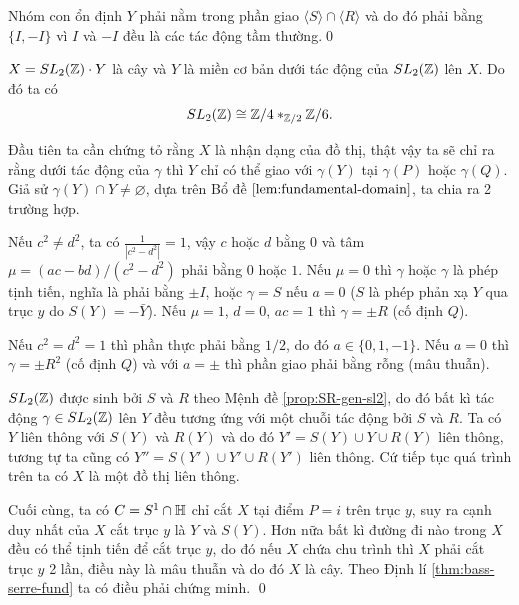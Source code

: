Nhóm con ổn định $Y$ phải nằm trong phần giao $\langle S \rangle \cap \langle R \rangle$ và do đó phải bằng $\{I,-I\}$ vì $I$ và $-I$ đều là các tác động tầm thường.\qed

\begin{theorem}
    $X = SL_2(\mathbb Z) \cdot Y$ là cây và $Y$ là miền cơ bản dưới tác động của $SL_2(\mathbb Z)$ lên $X$. Do đó ta có
    $$
        SL_2(\mathbb Z) \cong \mathbb Z/4 *_{\mathbb Z/2} \mathbb Z/6.
    $$
\end{theorem}

\startproof Đầu tiên ta cần chứng tỏ rằng $X$ là nhận dạng của đồ thị, thật vậy ta sẽ chỉ ra rằng dưới tác động của $\gamma$ thì $Y$ chỉ có thể giao với $\gamma (Y)$ tại $\gamma(P)$ hoặc $\gamma(Q)$. Giả sử $\gamma(Y) \cap Y \neq \varnothing$, dựa trên Bổ đề $\ref{lem:fundamental-domain}$, ta chia ra 2 trường hợp.

Nếu $c^2 \neq d^2$, ta có $\frac{1}{|c^2-d^2|} = 1$, vậy $c$ hoặc $d$ bằng $0$ và tâm $\mu = (ac-bd)/(c^2-d^2)$ phải bằng $0$ hoặc $1$. Nếu $\mu = 0$ thì $\gamma$ hoặc $\gamma$ là phép tịnh tiến, nghĩa là phải bằng $\pm I$, hoặc $\gamma = S$ nếu $a = 0$ ($S$ là phép phản xạ $Y$ qua trục $y$  do $S(Y) = -\bar{Y}$). Nếu $\mu = 1$, $d = 0$, $ac = 1$ thì $\gamma = \pm R$ (cố định $Q$).

Nếu $c^2 = d^2 = 1$ thì phần thực phải bằng $1/2$, do đó $a \in \{0,1,-1\}$. Nếu $a = 0$ thì $\gamma = \pm R^2$ (cố định $Q$) và với $a = \pm$ thì phần giao phải bằng rỗng (mâu thuẫn).

$SL_2(\mathbb Z)$ được sinh bởi $S$ và $R$ theo Mệnh đề \ref{prop:SR-gen-sl2}, do đó bất kì tác động $\gamma \in SL_2(\mathbb Z)$ lên $Y$ đều tương ứng với một chuỗi tác động bởi $S$ và $R$. Ta có $Y$ liên thông với $S(Y)$ và $R(Y)$ và do đó $Y' = S(Y) \cup Y \cup R(Y)$ liên thông, tương tự ta cũng có $Y'' = S(Y') \cup Y' \cup R(Y')$ liên thông. Cứ tiếp tục quá trình trên ta có $X$ là một đồ thị liên thông.

Cuối cùng, ta có $C = S^1 \cap \mathbb H$ chỉ cắt $X$ tại điểm $P=i$ trên trục $y$, suy ra cạnh duy nhất của $X$ cắt trục $y$ là $Y$ và $S(Y)$. Hơn nữa bất kì đường đi nào trong $X$ đều có thể tịnh tiến để cắt trục $y$, do đó nếu $X$ chứa chu trình thì $X$ phải cắt trục $y$ 2 lần, điều này là mâu thuẫn và do đó $X$ là cây. Theo Định lí \ref{thm:bass-serre-fund} ta có điều phải chứng minh. \qed

